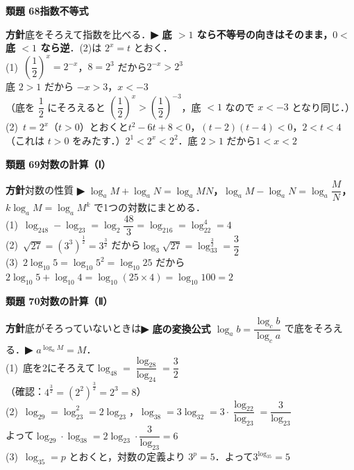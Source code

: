 \documentclass[a4paper,11pt]{ltjsarticle}
\newcommand{\ans}[2]{\Needspace{5\baselineskip}\vspace{6pt}%
  {\sffamily\bfseries 類題 #1\quad #2}\par}
\newcommand{\point}[1]{\textsf{\bfseries ▶ #1}}
\begin{document}
\ans{68}{指数不等式}
\begin{kai}
\textbf{方針}\quad 底をそろえて指数を比べる．\point{底 $>1$ なら不等号の向きはそのまま，$0<$ 底 $<1$ なら逆}．(2)は $2^x=t$ とおく．\\[2pt]
(1)\ $\left(\dfrac12\right)^x=2^{-x}$，$8=2^3$ だから\quad $2^{-x}>2^3$\\
\hspace*{1.5em}底 $2>1$ だから $-x>3$，\quad $x<-3$\\
\hspace*{1.5em}（底を $\dfrac12$ にそろえると $\left(\dfrac12\right)^x>\left(\dfrac12\right)^{-3}$，底 $<1$ なので $x<-3$ となり同じ．）\\[2pt]
(2)\ $t=2^x$（$t>0$）とおくと\quad $t^2-6t+8<0$，\quad $(t-2)(t-4)<0$，\quad $2<t<4$\\
\hspace*{1.5em}（これは $t>0$ をみたす．）\quad $2^1<2^x<2^2$．底 $2>1$ だから\quad $1<x<2$
\end{kai}

\ans{69}{対数の計算（Ⅰ）}
\begin{kai}
\textbf{方針}\quad 対数の性質 \point{$\log_aM+\log_aN=\log_aMN$，$\log_aM-\log_aN=\log_a\dfrac MN$，$k\log_aM=\log_aM^k$} で1つの対数にまとめる．\\[2pt]
(1)\ $\log_248-\log_23=\log_2\dfrac{48}3=\log_216=\log_22^4=4$\\[2pt]
(2)\ $\sqrt{27}=(3^3)^{\frac12}=3^{\frac32}$ だから\quad $\log_3\sqrt{27}=\log_33^{\frac32}=\dfrac32$\\[2pt]
(3)\ $2\log_{10}5=\log_{10}5^2=\log_{10}25$ だから\\
\hspace*{1.5em}$2\log_{10}5+\log_{10}4=\log_{10}(25\times4)=\log_{10}100=2$
\end{kai}

\ans{70}{対数の計算（Ⅱ）}
\begin{kai}
\textbf{方針}\quad 底がそろっていないときは\point{底の変換公式 $\log_ab=\dfrac{\log_cb}{\log_ca}$} で底をそろえる．\point{$a^{\log_aM}=M$}．\\[2pt]
(1)\ 底を2にそろえて\quad $\log_48=\dfrac{\log_28}{\log_24}=\dfrac{3}{2}$\\
\hspace*{1.5em}（確認：$4^{\frac32}=(2^2)^{\frac32}=2^3=8$）\\[2pt]
(2)\ $\log_29=\log_23^2=2\log_23$，\quad $\log_38=3\log_32=3\cdot\dfrac{\log_22}{\log_23}=\dfrac3{\log_23}$\\
\hspace*{1.5em}よって\quad $\log_29\cdot\log_38=2\log_23\cdot\dfrac3{\log_23}=6$\\[2pt]
(3)\ $\log_35=p$ とおくと，対数の定義より $3^p=5$．よって\quad $3^{\log_35}=5$
\end{kai}
\end{document}
